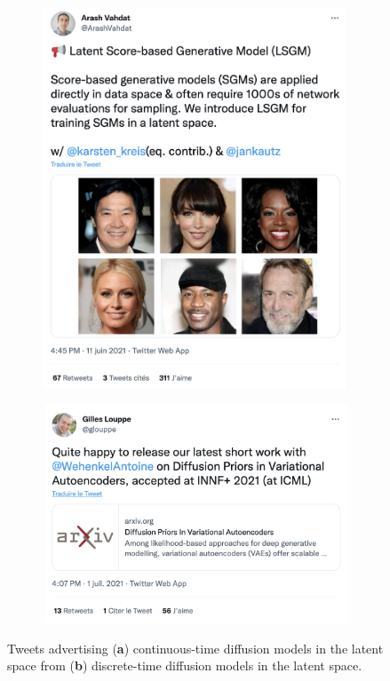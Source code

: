 \begin{figure}[h]
  \centering
  \begin{subfigure}[b]{.48\textwidth}
    \centering
    \includegraphics[width=.85\textwidth]{figures/impact_scholar/cont_diff_tweet.png}
    \caption{}
    \label{fig:cont_tweet}
  \end{subfigure}
  \begin{subfigure}[b]{.48\textwidth}
    \centering
    \includegraphics[width=.9\textwidth]{figures/impact_scholar/discret_diff_tweet.png}
    \caption{}
    \label{fig:discrete_tweet}
  \end{subfigure}
  \caption{Tweets advertising (\textbf{a}) continuous-time diffusion models in the latent space from \citet{vahdat2021score} (\textbf{b}) discrete-time diffusion models in the latent space.}
\end{figure}
